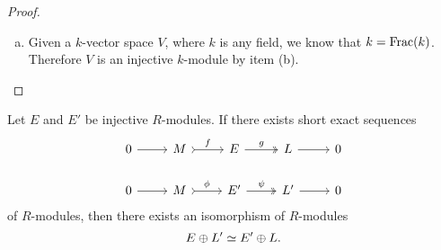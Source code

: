 \begin{proof}
\begin{enumerate}[(a)]
        \item Given a \(k\)-vector space \(V\), where \(k\) is any field, we know that
              \(k = \operatorname{Frac}(k)\). Therefore \(V\) is an injective \(k\)-module by item (b).
    \end{enumerate}
\end{proof}

\begin{proposition}
    \label{prop:schanuel-lemma-dual}
    Let \(E\) and \(E'\) be injective \(R\)-modules. If there exists short exact
    sequences
    \[
        \begin{tikzcd}
            0 \ar[r] &M \ar[r, tail, "f"] &E \ar[r, two heads, "g"] &L \ar[r] &0
            \\
            0 \ar[r] &M \ar[r, tail, "\phi"] &E' \ar[r, two heads, "\psi"] &L' \ar[r] &0
        \end{tikzcd}
    \]
    of \(R\)-modules, then there exists an isomorphism of \(R\)-modules
    \[
        E \oplus L' \simeq E' \oplus L.
    \]
\end{proposition}

